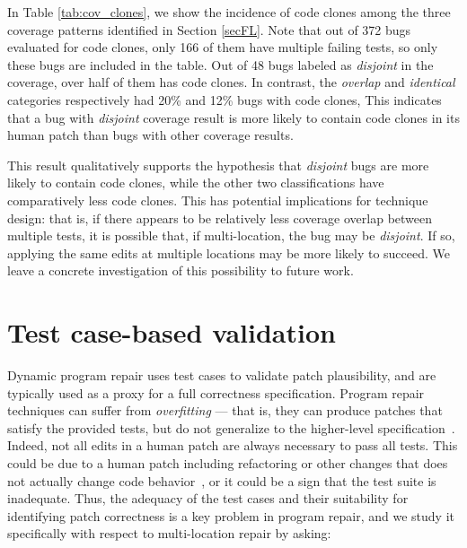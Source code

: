 \documentclass[10pt, conference]{IEEEtran}
\begin{document}
In Table \ref{tab:cov_clones}, we show the incidence of code clones among the three 
coverage patterns identified in Section \ref{secFL}. Note that out of 372 bugs evaluated for code clones, only 166 of them have multiple failing tests, so only these bugs are included in the table.  Out of 48 bugs labeled as 
\emph{disjoint} in the coverage, over half of them has code clones. In contrast, the 
\emph{overlap} and \emph{identical} categories respectively had 20\% and 12\% bugs with code clones, 
This indicates that a 
bug with \emph{disjoint} coverage result is more likely to contain code clones in its
human patch than bugs with other coverage results. 

This result qualitatively supports the hypothesis that \emph{disjoint} bugs are more likely to contain 
code clones, while the other two classifications have comparatively less code
clones. This has potential implications for technique design: that is, if there
appears to be relatively less coverage overlap between multiple tests, it is
possible that, if multi-location, the bug may be \emph{disjoint}.  If so,
applying the same edits at multiple locations may be more likely to succeed.  We
leave a concrete investigation of this possibility to future work.



\section{Test case-based validation}
\label{sec:tests}

Dynamic program repair uses test cases to validate patch plausibility, and are
typically used as a proxy for a full correctness specification.  Program repair
techniques can suffer from \emph{overfitting} --- that is, they can produce
patches that satisfy the provided tests, but do not generalize to the
higher-level specification~\cite{Smith15fse}.  
%
Indeed, not all edits in a human patch are always necessary to pass all tests. This could be
due to a human patch including refactoring or other changes that does not actually
change code behavior~\cite{api-refactoring, tangledchanges}, or it could be a sign that the test
suite is inadequate.  
Thus, the adequacy of the test
cases and their suitability for identifying patch correctness is a key problem
in program repair, and we study it specifically with respect to multi-location
repair by asking:

\end{document}
